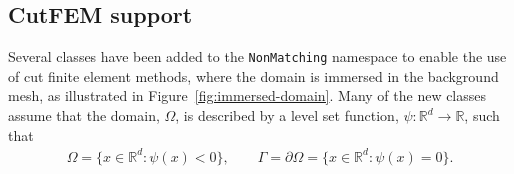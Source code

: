 \documentclass{ansarticle-preprint}
\begin{document}
\subsection{CutFEM support}\label{sec:cut}

Several classes have been added to the \texttt{NonMatching} namespace to enable the use of cut finite element methods, where the domain is immersed in the background mesh, as illustrated in Figure~\ref{fig:immersed-domain}.
Many of the new classes assume that the domain, $\Omega$, is described by a level set function,
$\psi : \mathbb{R}^d \to \mathbb{R}$, such that
\begin{align}
  \Omega = \{x \in \mathbb{R}^d : \psi(x)<0\},
  \qquad
  \Gamma = \partial \Omega = \{x \in \mathbb{R}^d : \psi(x) = 0\}.
\end{align}
\end{document}
